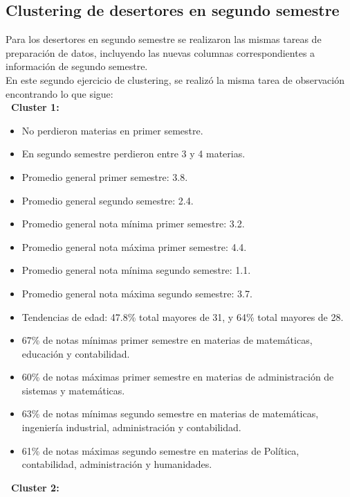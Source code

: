 \documentclass[fleqn,10pt]{SelfArx} %
\begin{document}
\subsection{Clustering de desertores en segundo semestre}

Para los desertores en segundo semestre se realizaron las mismas tareas de preparación de datos, incluyendo las nuevas columnas correspondientes a información de segundo semestre.\\

En este segundo ejercicio de clustering, se realizó la misma tarea de observación encontrando lo que sigue:\\

{\bf \textbullet\ Cluster 1:}\\

\begin{itemize}
	\item No perdieron materias en primer semestre.
	\item En segundo semestre perdieron entre 3 y 4 materias.
	\item Promedio general primer semestre: 3.8.
	\item Promedio general segundo semestre: 2.4.
	\item Promedio general nota mínima primer semestre: 3.2.
	\item Promedio general nota máxima primer semestre: 4.4.
	\item Promedio general nota mínima segundo semestre: 1.1.
	\item Promedio general nota máxima segundo semestre: 3.7.
	\item Tendencias de edad: 47.8\% total mayores de 31, y 64\% total mayores de 28.
	\item 67\% de notas mínimas primer semestre en materias de matemáticas, educación y contabilidad.
	\item 60\% de notas máximas primer semestre en materias de administración de sistemas y matemáticas.
	\item 63\% de notas mínimas segundo semestre en materias de matemáticas, ingeniería industrial, administración y contabilidad.
	\item 61\% de notas máximas segundo semestre en materias de Política, contabilidad, administración y humanidades.
\end{itemize} 

{\bf \textbullet\ Cluster 2:}\\
\end{document}
